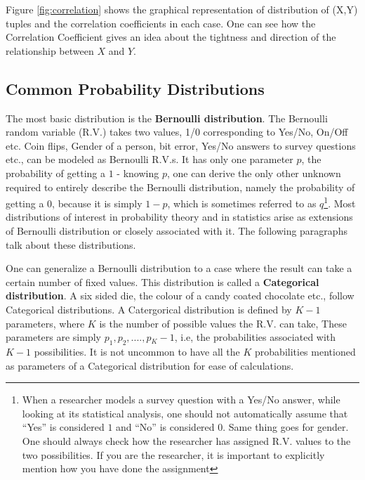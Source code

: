 Figure \ref{fig:correlation} shows the graphical representation of distribution of (X,Y) tuples and the correlation coefficients in each case. One can see how the Correlation Coefficient gives an idea about the tightness and direction of the relationship between $X$ and $Y$.

\subsection {Common Probability Distributions}
The most basic distribution is the \textbf{Bernoulli distribution}. The Bernoulli random variable (R.V.) takes two values, 1/0 corresponding to Yes/No, On/Off etc. Coin flips, Gender of a person, bit error, Yes/No answers to survey questions etc., can be modeled as Bernoulli R.V.s. It has only one parameter $p$, the probability of getting a $1$ - knowing $p$, one can derive the only other unknown required to entirely describe the Bernoulli distribution, namely the probability of getting a $0$, because it is simply $1-p$, which is sometimes referred to as $q$\footnote{When a researcher models a survey question with a Yes/No answer, while looking at its statistical analysis, one should not automatically assume that ``Yes'' is considered $1$ and ``No'' is considered $0$. Same thing goes for gender. One should always check how the researcher has assigned R.V. values to the two possibilities. If you are the researcher, it is important to explicitly mention how you have done the assignment}. Most distributions of interest in probability theory and in statistics arise as extensions of Bernoulli distribution or closely associated with it. The following paragraphs talk about these distributions.

One can generalize a Bernoulli distribution to a case where the result can take a certain number of fixed values. This distribution is called a \textbf{Categorical distribution}. A six sided die, the colour of a candy coated chocolate etc., follow Categorical distributions. A Catergorical distribution is defined by $K-1$ parameters, where $K$ is the number of possible values the R.V. can take, These parameters are simply $p_1, p_2, .... , p{_K-1}$, i.e, the probabilities associated with $K-1$ possibilities. It is not uncommon to have all the $K$ probabilities mentioned as parameters of a Categorical distribution for ease of calculations.

